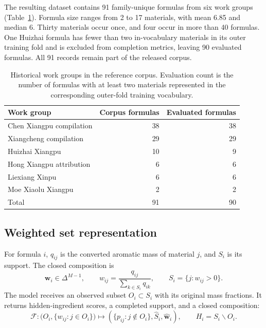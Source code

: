 \documentclass[11pt,a4paper]{article}
\newcommand{\vect}[1]{\boldsymbol{#1}}
\begin{document}
The resulting dataset contains 91 family-unique formulas from six work groups (Table~\ref{tab:corpus}). Formula size ranges from 2 to 17 materials, with mean 6.85 and median 6. Thirty materials occur once, and four occur in more than 40 formulas. One Huizhai formula has fewer than two in-vocabulary materials in its outer training fold and is excluded from completion metrics, leaving 90 evaluated formulas. All 91 records remain part of the released corpus.

\begin{table}[t]
\centering
\caption{Historical work groups in the reference corpus. Evaluation count is the number of formulas with at least two materials represented in the corresponding outer-fold training vocabulary.}
\label{tab:corpus}
\begin{threeparttable}
\begin{tabular}{lrr}
\toprule
Work group & Corpus formulas & Evaluated formulas \\
\midrule
Chen Xiangpu compilation & 38 & 38 \\
Xiangcheng compilation & 29 & 29 \\
Huizhai Xiangpu & 10 & 9 \\
Hong Xiangpu attribution & 6 & 6 \\
Liexiang Xinpu & 6 & 6 \\
Moe Xiaolu Xiangpu & 2 & 2 \\
\midrule
Total & 91 & 90 \\
\bottomrule
\end{tabular}
\end{threeparttable}
\end{table}

\subsection{Weighted set representation}

For formula $i$, $q_{ij}$ is the converted aromatic mass of material $j$, and $S_i$ is its support. The closed composition is
\begin{equation}
\vect{w}_i\in\Delta^{M-1},\qquad
w_{ij}=\frac{q_{ij}}{\sum_{k\in S_i}q_{ik}},\qquad
S_i=\{j:w_{ij}>0\}.
\label{eq:closure}
\end{equation}
The model receives an observed subset $O_i\subset S_i$ with its original mass fractions. It returns hidden-ingredient scores, a completed support, and a closed composition:
\begin{equation}
\mathcal{F}:\bigl(O_i,\{w_{ij}:j\in O_i\}\bigr)
\longmapsto \left(\{p_{ij}:j\notin O_i\},\widehat S_i,\widehat{\vect{w}}_i\right),
\qquad H_i=S_i\mathbin{\backslash}O_i.
\label{eq:task}
\end{equation}
\end{document}
